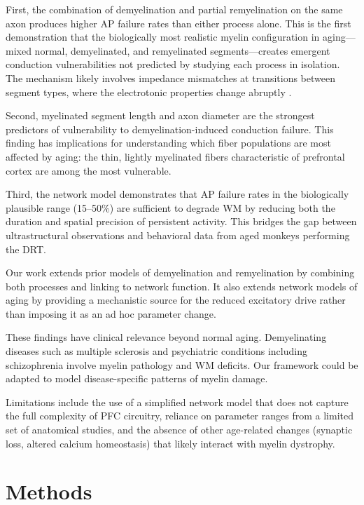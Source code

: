 \documentclass[11pt]{article}
\begin{document}
First, the combination of demyelination and partial remyelination on the same axon produces higher AP failure rates than either process alone. This is the first demonstration that the biologically most realistic myelin configuration in aging---mixed normal, demyelinated, and remyelinated segments---creates emergent conduction vulnerabilities not predicted by studying each process in isolation. The mechanism likely involves impedance mismatches at transitions between segment types, where the electrotonic properties change abruptly \citep{scurfield2018thin}.

Second, myelinated segment length and axon diameter are the strongest predictors of vulnerability to demyelination-induced conduction failure. This finding has implications for understanding which fiber populations are most affected by aging: the thin, lightly myelinated fibers characteristic of prefrontal cortex \citep{peters2002effects} are among the most vulnerable.

Third, the network model demonstrates that AP failure rates in the biologically plausible range (15--50\%) are sufficient to degrade WM by reducing both the duration and spatial precision of persistent activity. This bridges the gap between ultrastructural observations and behavioral data from aged monkeys performing the DRT.

Our work extends prior models of demyelination \citep{stephanova2005myelin, stephanova2008conduction} and remyelination \citep{scurfield2018thin} by combining both processes and linking to network function. It also extends network models of aging \citep{ibanez2020spiking} by providing a mechanistic source for the reduced excitatory drive rather than imposing it as an ad hoc parameter change.

These findings have clinical relevance beyond normal aging. Demyelinating diseases such as multiple sclerosis \citep{fields2008white} and psychiatric conditions including schizophrenia \citep{rietdijk2022myelin} involve myelin pathology and WM deficits. Our framework could be adapted to model disease-specific patterns of myelin damage.

Limitations include the use of a simplified network model that does not capture the full complexity of PFC circuitry, reliance on parameter ranges from a limited set of anatomical studies, and the absence of other age-related changes (synaptic loss, altered calcium homeostasis) that likely interact with myelin dystrophy.

\section{Methods}
\end{document}
